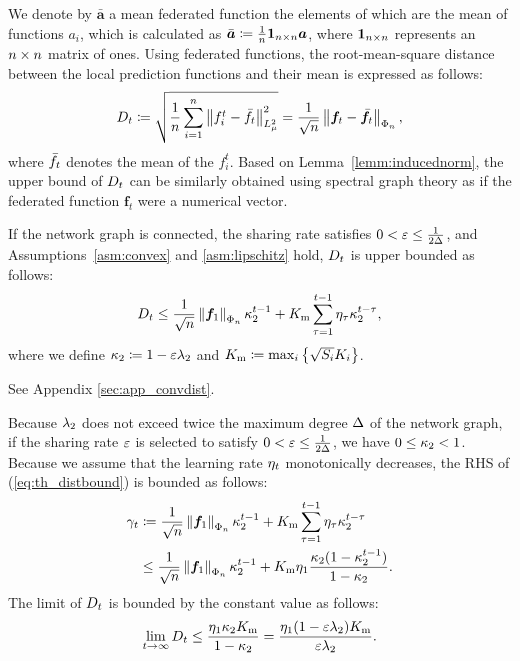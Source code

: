 \documentclass[journal]{IEEEtran}
\begin{document}
We denote by $\bar{\bm{a}}$ a mean federated function the elements of which are the mean of functions $a_i$,
which is calculated as $\bar{\bm{a}} \coloneqq \frac{1}{n}\bm{1}_{n\times n} \bm{a}$,
where $\bm{1}_{n\times n}$ represents an $n\times n$ matrix of ones.
Using federated functions, the root-mean-square distance between the local prediction functions and their mean is expressed as follows:
\begin{align}
  D_t \coloneqq \sqrt{\frac{1}{n}\sum_{i=1}^{n} \left\lVert f_i^t - \bar{f}_t \right\rVert_{L^2_{\mu}}^2} = \frac{1}{\sqrt{n}} \left\lVert \bm{f}_t - \bar{\bm{f}}_t \right\rVert_{\Phi_{n}},
\end{align}
where $\bar{f}_t$ denotes the mean of the $f_i^t$.
Based on Lemma~\ref{lemm:inducednorm},
the upper bound of $D_t$ can be similarly obtained using spectral graph theory as if the federated function $\bm{f}_t$ were a numerical vector.
\begin{theorem}\label{th:convdist}
  If the network graph is connected, the sharing rate satisfies $0 < \varepsilon \le \frac{1}{2\Delta}$,
  and Assumptions~\ref{asm:convex} and \ref{asm:lipschitz} hold,
  $D_t$ is upper bounded as follows:
  \begin{align}
    D_t \le \frac{1}{\sqrt{n}} \left\lVert \bm{f}_1 \right\rVert_{\Phi_{n}} \kappa_2^{t-1} + K_{\mathrm{m}}\sum_{\tau=1}^{t-1} \eta_{\tau} \kappa_2^{t-\tau}, \label{eq:th_distbound}
  \end{align}
where we define $\kappa_2\coloneqq 1-\varepsilon\lambda_2$ and $K_{\mathrm{m}}\coloneqq \max_{i} \left\{\sqrt{S_i} K_{i}\right\}$.
\end{theorem}
\begin{IEEEproof}
  See Appendix \ref{sec:app_convdist}.
\end{IEEEproof}
Because $\lambda_2$ does not exceed twice the maximum degree $\Delta$ of the network graph,
if the sharing rate $\varepsilon$ is selected to satisfy $0<\varepsilon\le\frac{1}{2\Delta}$, we have $0\le \kappa_2 < 1$.
Because we assume that the learning rate $\eta_t$ monotonically decreases,
the \gls{RHS} of (\ref{eq:th_distbound}) is bounded as follows:
\begin{align}
  \gamma_t &\coloneqq \frac{1}{\sqrt{n}} \left\lVert \bm{f}_1 \right\rVert_{\Phi_{n}} \kappa_2^{t-1} + K_{\mathrm{m}}\sum_{\tau=1}^{t-1} \eta_{\tau} \kappa_2^{t-\tau} \nonumber \\
             &\le \frac{1}{\sqrt{n}} \left\lVert \bm{f}_1 \right\rVert_{\Phi_{n}} \kappa_2^{t-1} + K_{\mathrm{m}} \eta_1 \frac{\kappa_2(1-\kappa_2^{t-1})}{1-\kappa_2}.
\end{align}
The limit of $D_t$ is bounded by the constant value as follows:
\begin{align}
  \lim_{t\to\infty}D_t \le \frac{\eta_1 \kappa_2 K_{\mathrm{m}}}{1-\kappa_2} = \frac{\eta_1 (1-\varepsilon\lambda_2) K_{\mathrm{m}}}{\varepsilon\lambda_2}. \label{eq:limDist}
\end{align}
\end{document}
